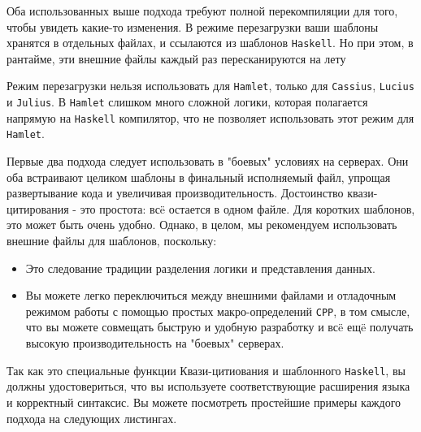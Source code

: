 Оба использованных выше подхода требуют полной перекомпиляции для того, чтобы
увидеть какие-то изменения. В режиме перезагрузки ваши шаблоны хранятся в
отдельных файлах, и ссылаются из шаблонов \texttt{Haskell}. Но при этом, в
рантайме, эти внешние файлы каждый раз пересканируются на лету

\begin{remark}
    Режим перезагрузки нельзя использовать для \texttt{Hamlet}, только для
    \texttt{Cassius}, \texttt{Lucius} и \texttt{Julius}.  В \texttt{Hamlet}
    слишком много сложной логики, которая полагается напрямую на
    \texttt{Haskell} компилятор, что не позволяет использовать этот режим для
    \texttt{Hamlet}.
\end{remark}

Первые два подхода следует использовать в "боевых" условиях на серверах.  Они
оба встраивают целиком шаблоны в финальный исполняемый файл, упрощая
развертывание кода и увеличивая производительность.  Достоинство
квази-цитирования - это простота: всë остается в одном файле.  Для коротких
шаблонов, это может быть очень удобно. Однако, в целом, мы рекомендуем
использовать внешние файлы для шаблонов, поскольку:

\begin{itemize}
    \item Это следование традиции разделения логики и представления данных.
    \item Вы можете легко переключиться между внешними файлами и отладочным
        режимом работы с помощью простых макро-определений \texttt{CPP}, в том
        смысле, что вы можете совмещать быструю и удобную разработку и всë ещë
        получать высокую производительность на "боевых" серверах.
\end{itemize}

Так как это специальные функции Квази-цитиования и шаблонного \texttt{Haskell},
вы должны удостовериться, что вы используете соответствующие расширения языка и
корректный синтаксис. Вы можете посмотреть простейшие примеры каждого подхода
на следующих листингах.


